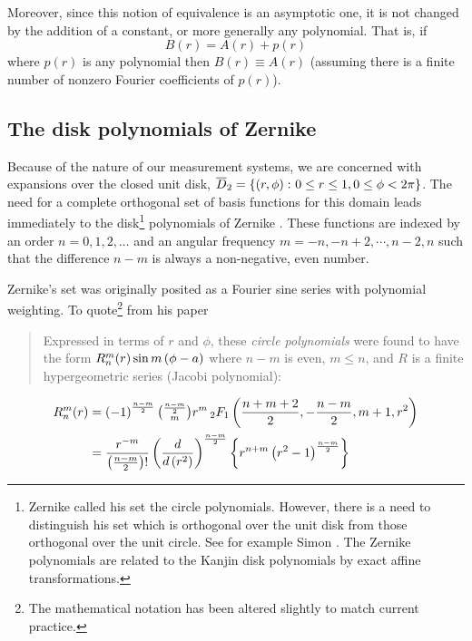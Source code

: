 \documentclass[preprint,12pt]{elsarticle}
\begin{document}
Moreover, since this notion of equivalence is an asymptotic one, it is not changed by the addition of a constant, or more generally any polynomial. That is, if
\begin{equation}
  B(r) = A(r) + p(r)
\end{equation}
where $p(r)$ is any polynomial then $B(r) \equiv A(r)$ (assuming there is a finite number of nonzero Fourier coefficients of $p(r)$).

\subsection{The disk polynomials of Zernike}
Because of the nature of our measurement systems, we are concerned with expansions over the closed unit disk, $\overline{D}_{2} = \lbrace \left( r,\phi \right)\colon 0\le r\le 1, 0\le \phi < 2\pi \rbrace$. The need for a complete orthogonal set of basis functions for this domain leads immediately to the disk\footnote{Zernike called his set the circle polynomials. However, there is a need to distinguish his set which is orthogonal over the unit disk from those orthogonal over the unit circle. See for example Simon \cite{Simon}. The Zernike polynomials are related to the Kanjin \cite{Kanjin} disk polynomials by exact affine transformations.} polynomials of Zernike \cite{Zernike}. These functions are indexed by an order $n=0,1,2,\dots$ and an angular frequency $m=-n, -n+2,\cdots,n-2,n$ such that the difference $n-m$ is always a non-negative, even number.

Zernike's set was originally posited as a Fourier sine series with polynomial weighting. To quote\footnote{The mathematical notation has been altered slightly to match current practice.} from his paper
%
\begin{quotation}
  Expressed in terms of $r$ and $\phi$, these \emph{circle polynomials} were found to have the form $R_{n}^{m}(r) \sin m\left( \phi - a \right)$ where $n-m$ is even, $m\le n$, and $R$ is a finite hypergeometric series (Jacobi polynomial):
\end{quotation}
%
\begin{equation}
  \begin{split}
    R_{n}^{m}(r) 
    & = \left( -1 \right)^{\frac{n-m}{2}} \tbinom{\frac{n-m}{2}}{m} r^{m}\,_{2}F_{1} \left( \frac{n+m+2}{2}, -\frac{n-m}{2}, m+1,r^{2} \right)\\
    & = \frac{r^{-m}}{\left( \frac{n-m}{2} \right)!} \left( \frac{d}{d\left( r^{2} \right)} \right)^{\frac{n-m}{2}} \left\{r^{n+m} \left( r^{2}-1 \right)^{\frac{n-m}{2}} \right\}
  \end{split}
\end{equation}
\end{document}
